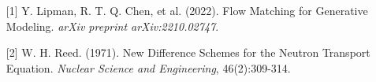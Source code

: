 \begin{talk}
\medskip
\begin{enumerate} 
\item[{[1]}] Y. Lipman, R. T. Q. Chen, et al. (2022). Flow Matching for Generative Modeling. {\it arXiv preprint arXiv:2210.02747}. 
\item[{[2]}] W. H. Reed. (1971). New Difference Schemes for the Neutron Transport Equation. {\it Nuclear Science and Engineering}, 46(2):309-314. 
\end{enumerate}

\end{talk}
